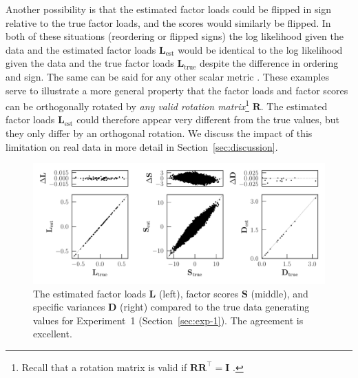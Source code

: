 \documentclass[twocolumn]{aastex62}
\newcommand{\vect}[1]{\boldsymbol{\mathbf{#1}}}
\renewcommand{\vec}[1]{\vect{#1}}
\newcommand{\transpose}{^\intercal}
\newcommand{\factorloads}{\textbf{L}}
\newcommand{\factorscores}{\textbf{S}}
\newcommand{\specificvariance}{\vec{D}}
\begin{document}
Another possibility is that the estimated factor loads could be flipped in sign 
relative to the true factor loads, and the scores would similarly be flipped. 
In both of these situations (reordering or flipped signs) the log likelihood 
given the data and the estimated factor loads $\factorloads_\textrm{est}$ 
would be identical to the log likelihood given the data and the true factor loads 
$\factorloads_\textrm{true}$
despite the difference in ordering and sign. The same can be said for any other
scalar metric \citep[e.g., Kullback-Leibler divergence;][]{Kullback:1951}.
These examples serve to illustrate a more 
general property that the factor loads and factor scores can be orthogonally 
rotated by \emph{any valid rotation matrix}\footnote{Recall that a rotation matrix is valid if 
$\vec{R}\vec{R}\transpose = \vec{I}\,\,$.} $\vec{R}$. The estimated factor loads 
$\factorloads_\textrm{est}$ could therefore appear very different from the true 
values, but they only differ by an orthogonal rotation. We discuss the impact of this limitation on real data in more detail in Section~\ref{sec:discussion}. 



\begin{figure}
	\includegraphics[width=\textwidth]{experiments/eval-figs/eval-1-compare-all.pdf}
	\caption{The estimated factor loads $\factorloads$ (left), factor scores $\factorscores$ (middle),
    		 and specific variances $\specificvariance$ (right) compared to the 
		 	 true data generating values
		 	 for Experiment~1 (Section~\ref{sec:exp-1}). The agreement is excellent.}
    \label{fig:exp1-compare}
\end{figure}
\end{document}
